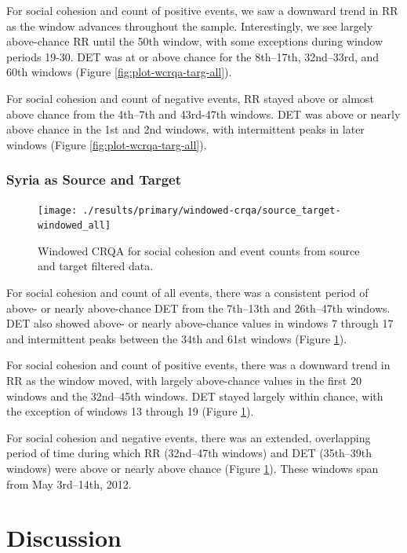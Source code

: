 \documentclass[
  english,
  man]{apa6}
\begin{document}
For social cohesion and count of positive events, we saw a downward trend in RR
as the window advances throughout the sample. Interestingly, we see largely
above-chance RR until the 50th window, with some exceptions during window
periods 19-30. DET was at or above chance for the 8th--17th, 32nd--33rd, and
60th windows (Figure \ref{fig:plot-wcrqa-targ-all}).

For social cohesion and count of negative events, RR stayed above or almost
above chance from the 4th--7th and 43rd-47th windows. DET was above or nearly
above chance in the 1st and 2nd windows, with intermittent peaks in later
windows (Figure \ref{fig:plot-wcrqa-targ-all}).

\hypertarget{syria-as-source-and-target-1}{%
\subsubsection{Syria as Source and Target}\label{syria-as-source-and-target-1}}

\begin{figure}
\texttt{[image: ./results/primary/windowed-crqa/source\_target-windowed\_all]} \caption{Windowed CRQA for social cohesion and event counts from source and target filtered data.}\label{fig:plot-wcrqa-source-targ-all}
\end{figure}

For social cohesion and count of all events, there was a consistent period of
above- or nearly above-chance DET from the 7th--13th and 26th--47th windows. DET
also showed above- or nearly above-chance values in windows 7 through 17 and
intermittent peaks between the 34th and 61st windows (Figure
\ref{fig:plot-wcrqa-source-targ-all}).

For social cohesion and count of positive events, there was a downward trend in
RR as the window moved, with largely above-chance values in the first 20 windows
and the 32nd--45th windows. DET stayed largely within chance, with the exception
of windows 13 through 19 (Figure \ref{fig:plot-wcrqa-source-targ-all}).

For social cohesion and negative events, there was an extended, overlapping
period of time during which RR (32nd--47th windows) and DET (35th--39th windows)
were above or nearly above chance (Figure
\ref{fig:plot-wcrqa-source-targ-all}). These windows span from May 3rd--14th,
2012.

\hypertarget{discussion}{%
\section{Discussion}\label{discussion}}
\end{document}
